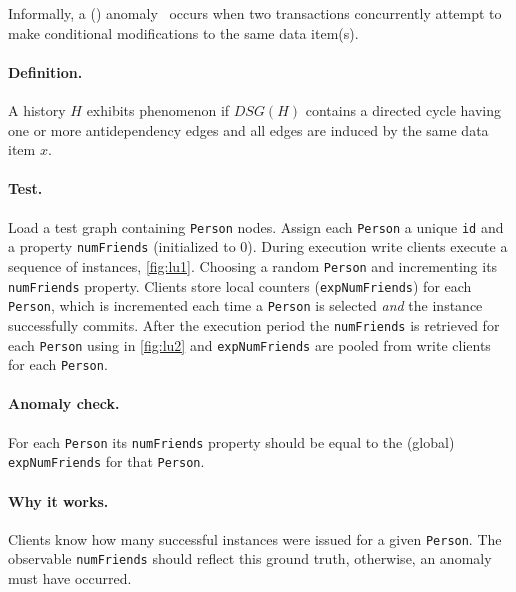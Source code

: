 Informally, a  () anomaly~\cite{DBLP:journals/tods/BailisFGHS16} occurs when two transactions concurrently attempt to make conditional modifications to the same data item(s).

\paragraph{Definition.}
A history $H$ exhibits phenomenon  if $\textit{DSG}(H)$ contains a directed cycle having one or more antidependency edges and all edges are induced by the same data item $x$.

\paragraph{Test.}
Load a test graph containing \texttt{Person} nodes.
Assign each \texttt{Person} a unique \texttt{id} and a property \texttt{numFriends} (initialized to 0).
During execution write clients execute a sequence of  instances, \autoref{fig:lu1}.
Choosing a random \texttt{Person} and incrementing its \texttt{numFriends} property.
Clients store local counters (\texttt{expNumFriends}) for each \texttt{Person}, which is incremented each time a \texttt{Person} is selected \emph{and} the  instance successfully commits.
After the execution period the \texttt{numFriends} is retrieved for each \texttt{Person} using  in \autoref{fig:lu2} and \texttt{expNumFriends} are pooled from write clients for each \texttt{Person}.

\paragraph{Anomaly check.}
For each \texttt{Person} its \texttt{numFriends} property should be equal to the (global) \texttt{expNumFriends} for that \texttt{Person}.

\paragraph{Why it works.}
Clients know how many successful  instances were issued for a given \texttt{Person}.
The observable \texttt{numFriends} should reflect this ground truth, otherwise, an  anomaly must have occurred.


